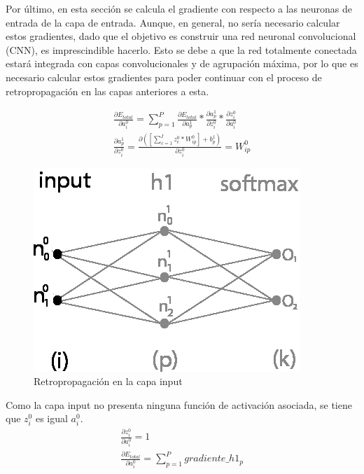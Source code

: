 Por último, en esta sección se calcula el gradiente con respecto a las neuronas de entrada de la capa de entrada. Aunque, en general, no sería necesario calcular estos gradientes, dado que el objetivo es construir una red neuronal convolucional (CNN), es imprescindible hacerlo. Esto se debe a que la red totalmente conectada estará integrada con capas convolucionales y de agrupación máxima, por lo que es necesario calcular estos gradientes para poder continuar con el proceso de retropropagación en las capas anteriores a esta.

\begin{gather}
	\frac{\partial E_{total}}{\partial a^0_i} = \sum_{p=1}^P \frac{\partial E_{total}}{\partial a^1_p} * \frac{\partial a^1_p}{\partial z^0_i} * \frac{\partial z^0_i}{\partial a^0_i} \label{grad_a_1} \\
	\frac{\partial a^1_p }{\partial z^0_i } = \frac{\partial ([\sum_{c=1}^{I} z^0_c * W^0_{ip}] + b^1_p) }{\partial z^0_i } = W^0_{ip} \label{grad_a_2}
\end{gather}

\begin{figure}[H]
	\centering
	\includegraphics[scale=0.35]{imagenes/nn_1_capa_input.jpg}  
	\caption{Retropropagación en la capa input}
	\label{fig:nn_1_capa_input}
\end{figure}

Como la capa input no presenta ninguna función de activación asociada, se tiene que $z^0_i$ es igual $a^0_i$. \\

\begin{gather}
	\frac{\partial z^0_i }{\partial a^0_i } = 1 \\
	\frac{\partial E_{total}}{\partial a^0_i} = \sum_{p=1}^{P} gradiente\_h1_p
\end{gather}

